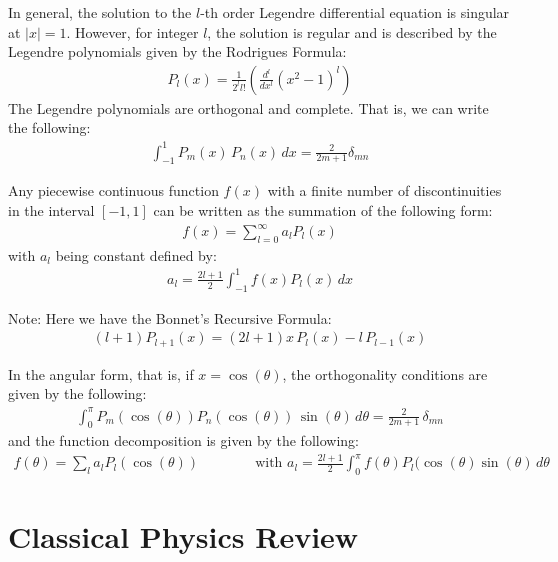 \documentclass[11pt,oneside]{book}
\theoremstyle{break}
\theoremstyle{break}
\newcommand{\note}{\color{red}Note: \color{black}}
\begin{document}
In general, the solution to the $l$-th order Legendre differential equation is singular at $|x| = 1$. However, for integer $l$, the solution is regular and is described by the Legendre polynomials given by the Rodrigues Formula:
\begin{align*}
P_l(x) = \frac{1}{2^l l!}\left( \frac{d^l}{dx^l} (x^2 -1)^l \right)
\end{align*}
The Legendre polynomials are orthogonal and complete. That is, we can write the following:
\begin{align*}
\int_{-1}^{1} P_m(x) \, P_n(x) \, dx = \frac{2}{2m+1}\delta_{mn}
\end{align*}

Any piecewise continuous function $f(x)$ with a finite number of discontinuities in the interval $[-1,1]$ can be written as the summation of the following form:
\begin{align*}
f(x) = \sum_{l=0}^\infty a_l P_l(x)
\end{align*}
with $a_l$ being constant defined by:
\begin{align*}
a_l = \frac{2l+1}{2}\int_{-1}^1 f(x)P_l(x)\, dx
\end{align*}

\hfill\break
\hfill\break
\note Here we have the Bonnet's Recursive Formula:
\begin{align*}
(l+1) P_{l+1}(x) = (2l+1)x\, P_l(x) - l\, P_{l-1}(x)
\end{align*}

\hfill\break
\hfill\break
In the angular form, that is, if $x = \cos(\theta)$, the orthogonality conditions are given by the following:
\begin{align*}
\int_0^\pi P_m(\cos(\theta)) P_n(\cos(\theta))\, \sin(\theta) \, d\theta = \frac{2}{2m+1}\, \delta_{mn}
\end{align*}
and the function decomposition is given by the following:
\begin{align*}
f(\theta) = \sum_l a_l P_l(\cos(\theta)) \qquad\qquad\text{with }a_l=\frac{2l+1}{2}\int_0^{\pi} f(\theta) P_l(\cos(\theta) \sin(\theta) \, d\theta 
\end{align*}

\newpage
\chapter{Classical Physics Review}
\end{document}
